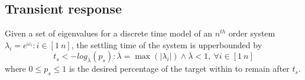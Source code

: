 \documentclass[sigconf]{llncs}
\begin{document}
\subsection{Transient response} 
\label{asec:transientspecification}

\begin{theorem}
Given a set of eigenvalues for a discrete time model of an $n^{th}$ order system $\lambda_i =e^{\omega_i}: i \in [1\ n]$, the settling time of the system is upperbounded by
\begin{equation}
t_s<-log_{\overline{\lambda}}({p_s}) : \overline{\lambda} =\max(|\lambda_i|) \wedge \overline{\lambda}<1,\ \forall i \in [1\ n]
\label{eq:set_time}
\end{equation}
where $0\leq p_s \leq 1$ is the desired percentage of the target within to remain after $t_s$.
\end{theorem} 
\end{document}
